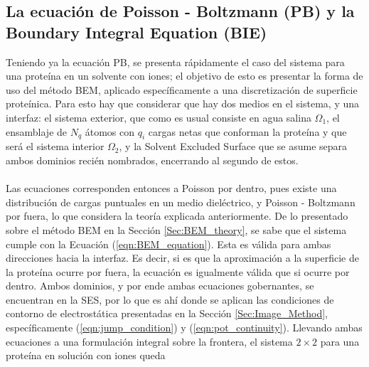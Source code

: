 \documentclass[12pt, oneside, numbers, spanish]{ezthesis}
\numberwithin{equation}{section}
\begin{document}
\subsection{La ecuación de Poisson - Boltzmann (PB) y la Boundary Integral Equation (BIE)}\label{subsec:BIE_PB}
Teniendo ya la ecuación PB, se presenta rápidamente el caso del sistema para una proteína en un solvente con iones; el objetivo de esto es presentar la forma de uso del método BEM, aplicado específicamente a una discretización de superficie proteínica. Para esto hay que considerar que hay dos medios en el sistema, y una interfaz: el sistema exterior, que como es usual consiste en agua salina $\Omega_1$, el ensamblaje de $N_q$ átomos con $q_i$ cargas netas que conforman la proteína y que será el sistema interior $\Omega_2$, y la Solvent Excluded Surface que se asume separa ambos dominios recién nombrados, encerrando al segundo de estos.\\\\
Las ecuaciones corresponden entonces a Poisson por dentro, pues existe una distribución de cargas puntuales en un medio dieléctrico, y Poisson - Boltzmann por fuera, lo que considera la teoría explicada anteriormente. De lo presentado sobre el método BEM en la Sección \ref{Sec:BEM_theory}, se sabe que el sistema cumple con la Ecuación (\ref{eqn:BEM_equation}).
Esta es válida para ambas direcciones hacia la interfaz. Es decir, si es que la aproximación a la superficie de la proteína ocurre por fuera, la ecuación es igualmente válida que si ocurre por dentro. Ambos dominios, y por ende ambas ecuaciones gobernantes, se encuentran en la SES, por lo que es ahí donde se aplican las condiciones de contorno de electrostática presentadas en la Sección \ref{Sec:Image_Method}, específicamente (\ref{eqn:jump_condition}) y (\ref{eqn:pot_continuity}).
Llevando ambas ecuaciones a una formulación integral sobre la frontera, el sistema $2\times2$ para una proteína en solución con iones queda \cite{Cooper2015}
\end{document}
